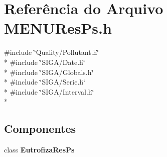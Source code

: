 \section{Referência do Arquivo M\+E\+N\+U\+Res\+Ps.\+h}
\label{_m_e_n_u_res_ps_8h}
{\ttfamily \#include \char`\"{}Quality/\+Pollutant.\+h\char`\"{}}\\*
{\ttfamily \#include \char`\"{}S\+I\+G\+A/\+Date.\+h\char`\"{}}\\*
{\ttfamily \#include \char`\"{}S\+I\+G\+A/\+Globals.\+h\char`\"{}}\\*
{\ttfamily \#include \char`\"{}S\+I\+G\+A/\+Serie.\+h\char`\"{}}\\*
{\ttfamily \#include \char`\"{}S\+I\+G\+A/\+Interval.\+h\char`\"{}}\\*
\subsection*{Componentes}
\begin{DoxyCompactItemize}
\item 
class {\bf Eutrofiza\+Res\+Ps}
\end{DoxyCompactItemize}
